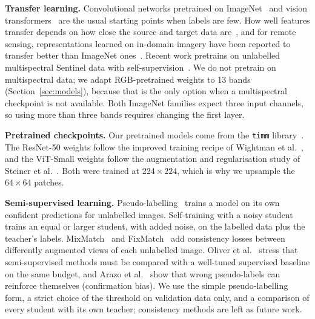 \documentclass[twoside,a4paper,11pt]{article}
\begin{document}
\textbf{Transfer learning.} Convolutional networks pretrained on ImageNet~\cite{he2016resnet} and vision transformers~\cite{dosovitskiy2021vit} are the usual starting points when labels are few. How well features transfer depends on how close the source and target data are~\cite{yosinski2014transfer}, and for remote sensing, representations learned on in-domain imagery have been reported to transfer better than ImageNet ones~\cite{neumann2019indomain}. Recent work pretrains on unlabelled multispectral Sentinel data with self-supervision~\cite{wang2023ssl4eo,cong2022satmae}. We do not pretrain on multispectral data; we adapt RGB-pretrained weights to 13 bands (Section~\ref{sec:models}), because that is the only option when a multispectral checkpoint is not available. Both ImageNet families expect three input channels, so using more than three bands requires changing the first layer.

\textbf{Pretrained checkpoints.} Our pretrained models come from the \texttt{timm} library~\cite{wightman2019timm}. The ResNet-50 weights follow the improved training recipe of Wightman et al.~\cite{wightman2021rsb}, and the ViT-Small weights follow the augmentation and regularisation study of Steiner et al.~\cite{steiner2022augreg}. Both were trained at $224\times224$, which is why we upsample the $64\times64$ patches.

\textbf{Semi-supervised learning.} Pseudo-labelling~\cite{lee2013pseudo} trains a model on its own confident predictions for unlabelled images. Self-training with a noisy student~\cite{xie2020noisystudent} trains an equal or larger student, with added noise, on the labelled data plus the teacher's labels. MixMatch~\cite{berthelot2019mixmatch} and FixMatch~\cite{sohn2020fixmatch} add consistency losses between differently augmented views of each unlabelled image. Oliver et al.~\cite{oliver2018realistic} stress that semi-supervised methods must be compared with a well-tuned supervised baseline on the same budget, and Arazo et al.~\cite{arazo2020confirmation} show that wrong pseudo-labels can reinforce themselves (confirmation bias). We use the simple pseudo-labelling form, a strict choice of the threshold on validation data only, and a comparison of every student with its own teacher; consistency methods are left as future work.
\end{document}
